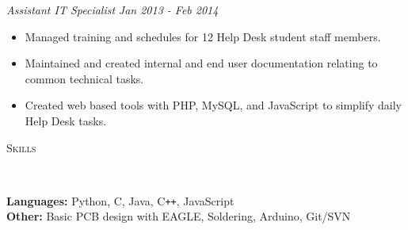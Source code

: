 \documentclass{article}
\newenvironment{changemargin}[2]{%
  \begin{list}{}{%
    \setlength{\topsep}{0pt}%
    \setlength{\leftmargin}{#1}%
    \setlength{\rightmargin}{#2}%
    \setlength{\listparindent}{\parindent}%
    \setlength{\itemindent}{\parindent}%
    \setlength{\parsep}{\parskip}%
  }%
  \item[]}{\end{list}
}
\newcommand{\lineover}{
	\begin{changemargin}{-0.05in}{-0.05in}
		\vspace*{-8pt}
		\hrulefill \\
		\vspace*{-2pt}
	\end{changemargin}
}
\newcommand{\header}[1]{
	\begin{changemargin}{-0.5in}{-0.5in}
		\scshape{#1}\\
  	\lineover
	\end{changemargin}
}
\newenvironment{body} {
	\vspace*{-16pt}
	\begin{changemargin}{-0.25in}{-0.5in}
  }	
	{\end{changemargin}
}
\begin{document}
\begin{body}


	\emph{Assistant IT Specialist} \hfill \emph{Jan 2013 - Feb 2014}\\
	\begin{itemize} \itemsep -0pt  %
		\item Managed training and schedules for 12 Help Desk student staff members.
		\item Maintained and created internal and end user documentation relating to common technical tasks.
		\item Created web based tools with PHP, MySQL, and JavaScript to simplify daily Help Desk tasks.
	\end{itemize}

\end{body}

\smallskip

\header{Skills}

\begin{body}
	\vspace{14pt}
	\textbf{Languages:}{} Python, C, Java, C{}\verb!++!, JavaScript\\%
	\textbf{Other:}{} Basic PCB design with EAGLE, Soldering, Arduino, Git/SVN\\
\end{body}

\smallskip

\end{document}
